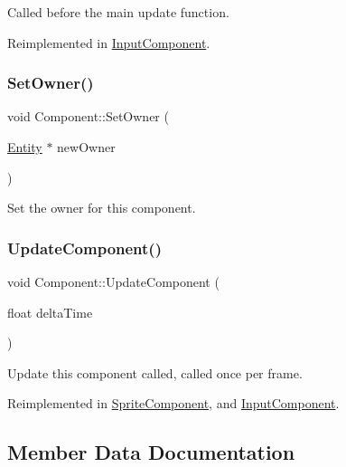 Called before the main update function. 

Reimplemented in \mbox{\hyperlink{class_input_component_a99f431a305362899b8a6682b390c8899}{Input\+Component}}.

\mbox{\label{class_component_afe37d738fe82aa6b77d7e7398651aa78}} 
\subsubsection{\texorpdfstring{Set\+Owner()}{SetOwner()}}
{\footnotesize\ttfamily void Component\+::\+Set\+Owner (\begin{DoxyParamCaption}\item[{\mbox{\hyperlink{class_entity}{Entity}} $\ast$}]{new\+Owner }\end{DoxyParamCaption})}

Set the owner for this component. \mbox{\label{class_component_a8afb7c9504f763728bfedf642cfc5f43}} 
\subsubsection{\texorpdfstring{Update\+Component()}{UpdateComponent()}}
{\footnotesize\ttfamily void Component\+::\+Update\+Component (\begin{DoxyParamCaption}\item[{float}]{delta\+Time }\end{DoxyParamCaption})\hspace{0.3cm}{\ttfamily [virtual]}}

Update this component called, called once per frame. 

Reimplemented in \mbox{\hyperlink{class_sprite_component_aba00f9c0ecc0a0de41f271267c5440ff}{Sprite\+Component}}, and \mbox{\hyperlink{class_input_component_a42d3b0dffbedfd8cf62702096780ed4d}{Input\+Component}}.



\subsection{Member Data Documentation}
\mbox{\label{class_component_a98e6a9c221fbd50fe38567a48d0da17e}} 
